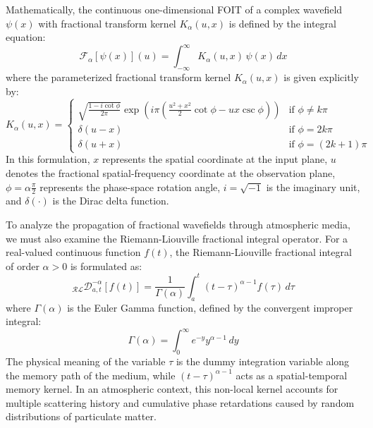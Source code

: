 \documentclass{article}
\begin{document}
Mathematically, the continuous one-dimensional FOIT of a complex wavefield $\psi(x)$ with fractional transform kernel $K_\alpha(u, x)$ is defined by the integral equation:
\begin{equation}
\mathcal{F}_{\alpha}[\psi(x)](u) = \int_{-\infty}^{\infty} K_{\alpha}(u, x) \, \psi(x) \, dx
\end{equation}
where the parameterized fractional transform kernel $K_{\alpha}(u, x)$ is given explicitly by:
\begin{equation}
K_{\alpha}(u, x) = 
\begin{cases} 
\sqrt{\frac{1 - i \cot \phi}{2\pi}} \exp \left( i \pi \left( \frac{u^2 + x^2}{2} \cot \phi - u x \csc \phi \right) \right) & \text{if } \phi \neq k\pi \\
\delta(u - x) & \text{if } \phi = 2k\pi \\
\delta(u + x) & \text{if } \phi = (2k+1)\pi
\end{cases}
\end{equation}
In this formulation, $x$ represents the spatial coordinate at the input plane, $u$ denotes the fractional spatial-frequency coordinate at the observation plane, $\phi = \alpha \frac{\pi}{2}$ represents the phase-space rotation angle, $i = \sqrt{-1}$ is the imaginary unit, and $\delta(\cdot)$ is the Dirac delta function. 

To analyze the propagation of fractional wavefields through atmospheric media, we must also examine the Riemann-Liouville fractional integral operator. For a real-valued continuous function $f(t)$, the Riemann-Liouville fractional integral of order $\alpha > 0$ is formulated as:
\begin{equation}
_{\mathcal{RL}}\mathcal{D}^{-\alpha}_{a, t} [f(t)] = \frac{1}{\Gamma(\alpha)} \int_{a}^{t} (t - \tau)^{\alpha - 1} f(\tau) \, d\tau
\end{equation}
where $\Gamma(\alpha)$ is the Euler Gamma function, defined by the convergent improper integral:
\begin{equation}
\Gamma(\alpha) = \int_{0}^{\infty} e^{-y} y^{\alpha - 1} \, dy
\end{equation}
The physical meaning of the variable $\tau$ is the dummy integration variable along the memory path of the medium, while $(t - \tau)^{\alpha - 1}$ acts as a spatial-temporal memory kernel. In an atmospheric context, this non-local kernel accounts for multiple scattering history and cumulative phase retardations caused by random distributions of particulate matter.
\end{document}
